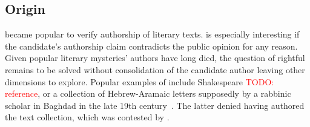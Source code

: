 \subsection{Origin}

\ai{} became popular to verify authorship of literary texts.
\ai{} is especially interesting if the candidate's authorship claim contradicts the public opinion for any reason.
Given popular literary mysteries' authors have long died, the question of rightful \ai{} remains to be solved without consolidation of the candidate author leaving other dimensions to explore.
Popular examples of \ai{} include Shakespeare \textcolor{red}{TODO: reference}, or a collection of Hebrew-Aramaic letters supposedly by a rabbinic scholar in Baghdad in the late 19th century~\citep{koppel_authorship_2004}.
The latter denied having authored the text collection, which was contested by \citet{koppel_authorship_2004}.
